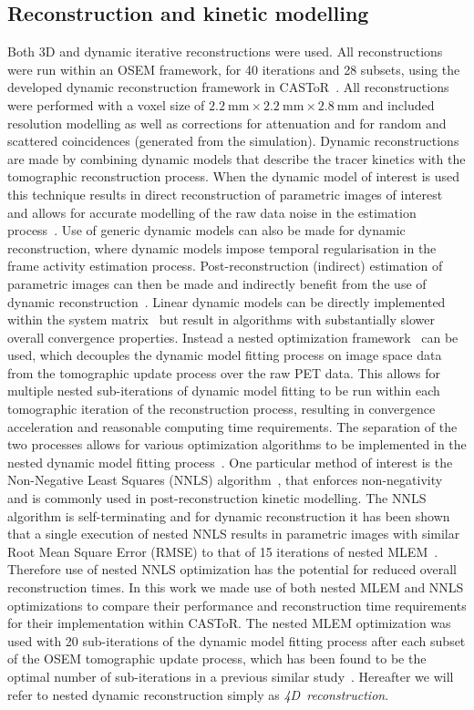 \subsection{Reconstruction and kinetic modelling}
Both 3D and dynamic iterative reconstructions were used. All reconstructions were run within an OSEM framework, for 40 iterations and 28 subsets, using the developed dynamic reconstruction framework in CASToR~\cite{Merlin2018}.
All reconstructions were performed with a voxel size of $2.2~\mathrm{mm}\times2.2~\mathrm{mm}\times2.8~\mathrm{mm}$ and included resolution modelling as well as corrections for attenuation and for random and scattered coincidences (generated from the simulation).
Dynamic reconstructions are made by combining dynamic models that describe the tracer kinetics with the tomographic reconstruction process. When the dynamic model of interest is used this technique results in direct reconstruction of parametric images of interest and allows for accurate modelling of the raw data noise in the estimation process~\cite{Carson1985,Matthews1995,Kamasak2003,Wang2008}. Use of generic dynamic models can also be made for dynamic reconstruction, where dynamic models impose temporal regularisation in the frame activity estimation process. Post-reconstruction (indirect) estimation of parametric images can then be made and indirectly benefit from the use of dynamic reconstruction~\cite{Reader2014,Novosad2016b}.
Linear dynamic models can be directly implemented within the system matrix~\cite{Matthews1995,Wang2008,Reader2014} but result in algorithms with substantially slower overall convergence properties.
Instead a nested optimization framework~\cite{Wang2010,Matthews2010} can be used, which decouples the dynamic model fitting process on image space data from the tomographic update process over the raw PET data. This allows for multiple nested sub-iterations of dynamic model fitting to be run within each tomographic iteration of the reconstruction process, resulting in convergence acceleration and reasonable computing time requirements.
The separation of the two processes allows for various optimization algorithms to be implemented in the nested dynamic model fitting process~\cite{Matthews2010}. One particular method of interest is the Non-Negative Least Squares (NNLS) algorithm~\cite{Lawson1995}, that enforces non-negativity and is commonly used in post-reconstruction kinetic modelling. The NNLS algorithm is self-terminating and for dynamic reconstruction it has been shown that a single execution of nested NNLS results in parametric images with similar Root Mean Square Error (RMSE) to that of 15 iterations of nested MLEM~\cite{Matthews2010}. Therefore use of nested NNLS optimization has the potential for reduced overall reconstruction times.
In this work we made use of both nested MLEM and NNLS optimizations to compare their performance and reconstruction time requirements for their implementation within CASToR. 
The nested MLEM optimization was used with 20 sub-iterations of the dynamic model fitting process after each subset of the OSEM tomographic update process, which has been found to be the optimal number of sub-iterations in a previous similar study~\cite{Karakatsanis2016a}.  
Hereafter we will refer to nested dynamic reconstruction simply as \mbox{\textit{4D reconstruction}}. 


